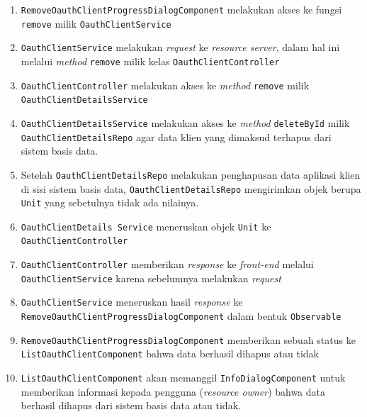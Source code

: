 \documentclass[pdftex,12pt, oneside]{article}
\begin{document}
\begin{itemize}
\begin{enumerate}
		\item \texttt{RemoveOauthClientProgressDialogComponent} melakukan akses ke fungsi \texttt{remove} milik \texttt{OauthClientService}
		
		\item \texttt{OauthClientService} melakukan \textit{request} ke \textit{resource server}, dalam hal ini melalui \textit{method} \texttt{remove} milik kelas \texttt{OauthClientController}
		
		\item \texttt{OauthClientController} melakukan akses ke \textit{method} \texttt{remove} milik \texttt{OauthClientDetailsService}
		
		\item \texttt{OauthClientDetailsService} melakukan akses ke \textit{method} \texttt{deleteById} milik \texttt{OauthClientDetailsRepo} agar data klien yang dimaksud terhapus dari sistem basis data.
		
		\item Setelah \texttt{OauthClientDetailsRepo} melakukan penghapusan data aplikasi klien di sisi sistem basis data, \texttt{OauthClientDetailsRepo} mengirimkan objek berupa \texttt{Unit} yang sebetulnya tidak ada nilainya.
		
		\item \texttt{OauthClientDetails Service} meneruskan objek \texttt{Unit} ke \texttt{OauthClientController}
		
		\item \texttt{OauthClientController} memberikan \textit{response} ke \textit{front-end} melalui \texttt{OauthClientService} karena sebelumnya melakukan \textit{request}
		
		\item \texttt{OauthClientService} meneruskan hasil \textit{response} ke \texttt{RemoveOauthClientProgressDialogComponent} dalam bentuk \texttt{Observable}
		
		\item \texttt{RemoveOauthClientProgressDialogComponent} memberikan sebuah status ke \texttt{ListOauthClientComponent} bahwa data berhasil dihapus atau tidak
		
		\item \texttt{ListOauthClientComponent} akan memanggil \texttt{InfoDialogComponent} untuk memberikan informasi kepada pengguna (\textit{resource owner}) bahwa data berhasil dihapus dari sistem basis data atau tidak.
	\end{enumerate}		
	
\end{itemize}
\end{document}
